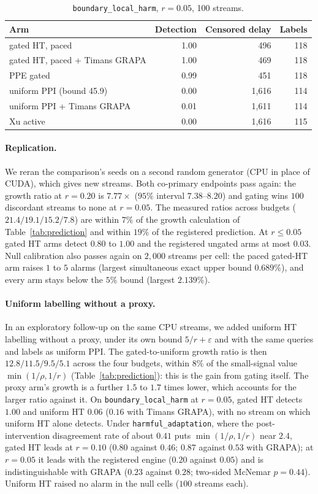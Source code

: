 \begin{table}[!h]
\centering
\caption{\texttt{boundary\_local\_harm}, $r=0.05$, 100 streams.}
\label{tab:r05}
\begin{tabular}{lrrr}
\toprule
Arm & Detection & Censored delay & Labels \\
\midrule
gated HT, paced & 1.00 & 496 & 118 \\
gated HT, paced + Timans GRAPA & 1.00 & 469 & 118 \\
PPE gated & 0.99 & 451 & 118 \\
uniform PPI (bound 45.9) & 0.00 & 1{,}616 & 114 \\
uniform PPI + Timans GRAPA & 0.01 & 1{,}611 & 114 \\
Xu active & 0.00 & 1{,}616 & 115 \\
\bottomrule
\end{tabular}
\end{table}

\paragraph{Replication.}
We reran the comparison's seeds on a second random generator (CPU in place of CUDA), which gives new streams. Both co-primary endpoints pass again:
the growth ratio at $r=0.20$ is $7.77\times$ ($95\%$ interval $7.38$--$8.20$) and gating wins $100$ discordant streams to none at $r=0.05$.
The measured ratios across budgets ($21.4/19.1/15.2/7.8$) are within $7\%$ of the growth calculation of Table~\ref{tab:prediction} and within $19\%$ of the registered prediction.
At $r\le0.05$ gated HT arms detect $0.80$ to $1.00$ and the registered ungated arms at most $0.03$.
Null calibration also passes again on $2{,}000$ streams per cell: the paced gated-HT arm raises $1$ to $5$ alarms (largest simultaneous exact upper bound $0.689\%$), and every arm stays below the $5\%$ bound (largest $2.139\%$).

\paragraph{Uniform labelling without a proxy.}
In an exploratory follow-up on the same CPU streams, we added uniform HT labelling without a proxy, under its own bound $5/r+\varepsilon$ and with the same queries and labels as uniform PPI.
The gated-to-uniform growth ratio is then $12.8/11.5/9.5/5.1$ across the four budgets, within $8\%$ of the small-signal value $\min(1/\rho,1/r)$ (Table~\ref{tab:prediction}):
this is the gain from gating itself. The proxy arm's growth is a further $1.5$ to $1.7$ times lower, which accounts for the larger ratio against it.
On \texttt{boundary\_local\_harm} at $r=0.05$, gated HT detects $1.00$ and uniform HT $0.06$ ($0.16$ with Timans GRAPA), with no stream on which uniform HT alone detects.
Under \texttt{harmful\_adaptation}, where the post-intervention disagreement rate of about $0.41$ puts $\min(1/\rho,1/r)$ near $2.4$,
gated HT leads at $r=0.10$ ($0.80$ against $0.46$; $0.87$ against $0.53$ with GRAPA);
at $r=0.05$ it leads with the registered engine ($0.20$ against $0.05$) and is indistinguishable with GRAPA ($0.23$ against $0.28$; two-sided McNemar $p=0.44$).
Uniform HT raised no alarm in the null cells ($100$ streams each).

